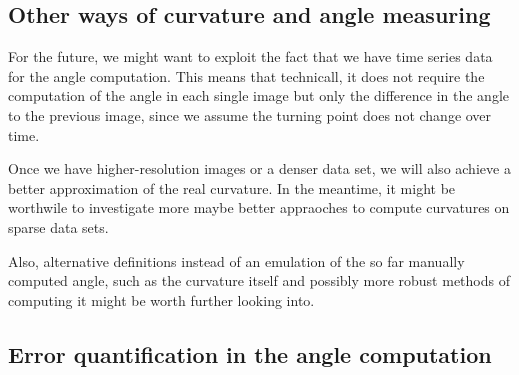 \subsection{Other ways of curvature and angle measuring}


For the future, we might want to exploit the fact that we have time series data for the angle computation. This means that technicall, it does not require the computation of the angle in each single image but only the difference in the angle to the previous image, since we assume the turning point does not change over time. 

Once we have higher-resolution images or a denser data set, we will also  achieve a better approximation of the real curvature. In the meantime, it might be worthwile to investigate more maybe better appraoches to compute curvatures on sparse data sets. 

Also, alternative definitions instead of an emulation of the so far manually computed angle, such as the curvature itself and possibly more robust methods of computing it might be worth further looking into. 
 

%
%




\subsection{Error quantification in the angle computation}


